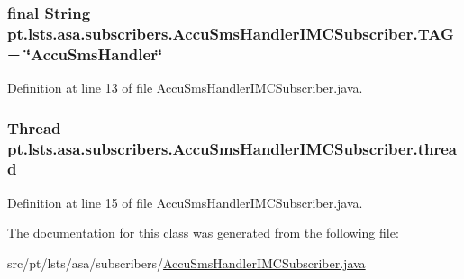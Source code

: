 \subsubsection[{T\+A\+G}]{\setlength{\rightskip}{0pt plus 5cm}final String pt.\+lsts.\+asa.\+subscribers.\+Accu\+Sms\+Handler\+I\+M\+C\+Subscriber.\+T\+A\+G = \char`\"{}Accu\+Sms\+Handler\char`\"{}\hspace{0.3cm}{\ttfamily [static]}}\label{classpt_1_1lsts_1_1asa_1_1subscribers_1_1AccuSmsHandlerIMCSubscriber_aa3a344766522e3457edc9f30d57bd508}


Definition at line 13 of file Accu\+Sms\+Handler\+I\+M\+C\+Subscriber.\+java.

\hypertarget{classpt_1_1lsts_1_1asa_1_1subscribers_1_1AccuSmsHandlerIMCSubscriber_af1b690f9a0e7831ede05d5d571ed3945}{}
\subsubsection[{thread}]{\setlength{\rightskip}{0pt plus 5cm}Thread pt.\+lsts.\+asa.\+subscribers.\+Accu\+Sms\+Handler\+I\+M\+C\+Subscriber.\+thread\hspace{0.3cm}{\ttfamily [private]}}\label{classpt_1_1lsts_1_1asa_1_1subscribers_1_1AccuSmsHandlerIMCSubscriber_af1b690f9a0e7831ede05d5d571ed3945}


Definition at line 15 of file Accu\+Sms\+Handler\+I\+M\+C\+Subscriber.\+java.



The documentation for this class was generated from the following file\+:\begin{DoxyCompactItemize}
\item 
src/pt/lsts/asa/subscribers/\hyperlink{AccuSmsHandlerIMCSubscriber_8java}{Accu\+Sms\+Handler\+I\+M\+C\+Subscriber.\+java}\end{DoxyCompactItemize}
